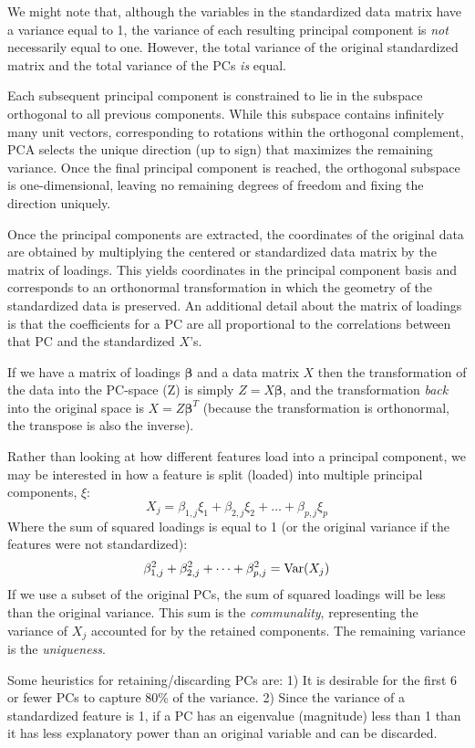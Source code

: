 We might note that, although the variables in the standardized data matrix have a variance equal to 1, the variance of each resulting principal component is \textit{not} necessarily equal to one. However, the total variance of the original standardized matrix and the total variance of the PCs \textit{is} equal. 

Each subsequent principal component is constrained to lie in the subspace orthogonal to all previous components. While this subspace contains infinitely many unit vectors, corresponding to rotations within the orthogonal complement, PCA selects the unique direction (up to sign) that maximizes the remaining variance. Once the final principal component is reached, the orthogonal subspace is one-dimensional, leaving no remaining degrees of freedom and fixing the direction uniquely.

Once the principal components are extracted, the coordinates of the original data are obtained by multiplying the centered or standardized data matrix by the matrix of loadings. This yields coordinates in the principal component basis and corresponds to an orthonormal transformation in which the geometry of the standardized data is preserved. An additional detail about the matrix of loadings is that the coefficients for a PC are all proportional to the correlations between that PC and the standardized $X$'s.

If we have a matrix of loadings $\boldsymbol\beta$ and a data matrix $X$ then the transformation of the data into the PC-space (Z) is simply $Z=X \boldsymbol\beta$, and the transformation \textit{back} into the original space is $X = Z\boldsymbol\beta^T$ (because the transformation is orthonormal, the transpose is also the inverse). 

Rather than looking at how different features load into a principal component, we may be interested in how a feature is split (loaded) into multiple principal components, $\xi$:
\[
X_j = \beta_{1,j} \xi_1 + \beta_{2, j}\xi_2 + \dots + \beta_{p, j} \xi_{p}
\]
Where the sum of squared loadings is equal to 1 (or the original variance if the features were not standardized):
\[
\beta_{1, j}^2 + \beta_{2,j}^2 + \dots + \beta_{p,j}^2 = \mathrm{Var}(X_j)
\]
If we use a subset of the original PCs, the sum of squared loadings will be less than the original variance. This sum is the \textit{communality}, representing the variance of $X_j$ accounted for by the retained components. The remaining variance is the \textit{uniqueness}.

Some heuristics for retaining/discarding PCs are: 1) It is desirable for the first 6 or fewer PCs to capture 80\% of the variance. 2) Since the variance of a standardized feature is 1, if a PC has an eigenvalue (magnitude) less than 1 than it has less explanatory power than an original variable and can be discarded.

